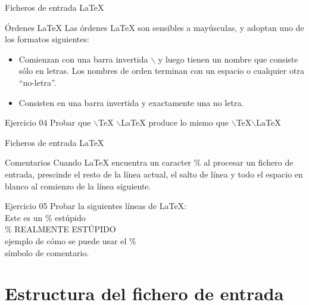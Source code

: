\documentclass[10pt]{beamer}
\begin{document}
\begin{frame}{Ficheros de entrada \LaTeX{}}
	\begin{block}{Órdenes \LaTeX{}}
		Las órdenes \LaTeX{} son sensibles a mayúsculas, y adoptan uno de los formatos siguientes:
		\begin{itemize}
			\item Comienzan con una barra invertida $\backslash$ y luego tienen un nombre que consiste sólo en letras. Los nombres de orden terminan con un espacio o cualquier otra “no-letra”.
			\item Consisten en una barra invertida y exactamente una no letra.
		\end{itemize}	
	\end{block}
	
	\begin{exampleblock}{Ejercicio 04}
		Probar que $\backslash$TeX $\backslash$LaTeX produce lo mismo que $\backslash$TeX$\backslash$LaTeX
	\end{exampleblock}	
\end{frame}

\begin{frame}{Ficheros de entrada \LaTeX{}}
	\begin{block}{Comentarios}
		Cuando \LaTeX{} encuentra un caracter \% al procesar un fichero de entrada, prescinde el resto de la línea actual, el salto de línea y todo el espacio en blanco al comienzo de la línea siguiente.
	\end{block}
	\begin{exampleblock}{Ejercicio 05}
		Probar la siguientes líneas de \LaTeX{}: \\
		Este es un \% estúpido \\
		\% REALMENTE ESTÚPIDO \\
		\hspace{2cm} ejemplo de cómo se puede usar el \% \\
		\hspace{1cm} símbolo de comentario.
	\end{exampleblock}
\end{frame}

\section{Estructura del fichero de entrada}
\end{document}

